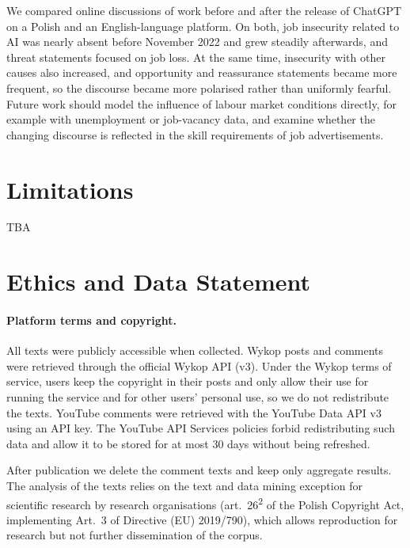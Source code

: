 \documentclass[11pt]{article}
\begin{document}
We compared online discussions of work before and after the release of ChatGPT
on a Polish and an English-language platform. On both, job insecurity related
to AI was nearly absent before November 2022 and grew steadily afterwards,
and threat statements focused on job loss. At the same time, insecurity with
other causes also increased, and opportunity and reassurance statements became
more frequent, so the discourse became more polarised rather than uniformly
fearful. Future work should model the influence of labour market conditions
directly, for example with unemployment or job-vacancy data, and examine
whether the changing discourse is reflected in the skill requirements of job
advertisements.


\section*{Limitations}

TBA



\section*{Ethics and Data Statement}
\label{sec:ethics}

\paragraph{Platform terms and copyright.} All texts were publicly accessible
when collected. Wykop posts and comments were retrieved through the official
Wykop API (v3). Under the Wykop terms of service, users keep the copyright in
their posts and only allow their use for running the service and for other
users' personal use, so we do not redistribute the texts. YouTube comments
were retrieved with the YouTube Data API v3 using an API key. The YouTube API
Services policies forbid redistributing such data and allow it to be stored
for at most 30 days without being refreshed.

After publication we delete the comment texts and keep only aggregate
results. The analysis of the texts relies on the text and data mining
exception for scientific research by research organisations (art.~26\textsuperscript{2}
of the Polish Copyright Act, implementing Art.~3 of Directive (EU)
2019/790), which allows reproduction for research but not further
dissemination of the corpus.
\end{document}
